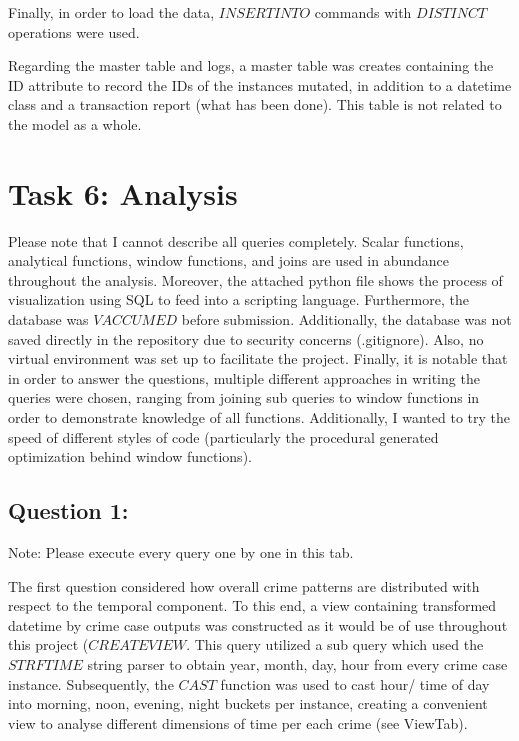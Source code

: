 \documentclass[a4paper]{article}
\begin{document}
Finally, in order to load the data, $INSERT INTO$ commands with $DISTINCT$ operations were used. 

Regarding the master table and logs, a master table was creates containing the ID attribute to record the IDs of the instances mutated, in addition to a datetime class and a transaction report (what has been done). This table is not related to the model as a whole.






\section{Task 6: Analysis}
Please note that I cannot describe all queries completely. Scalar functions, analytical functions, window functions, and joins are used in abundance throughout the analysis. Moreover, the attached python file shows the process of visualization using SQL to feed into a scripting language. Furthermore, the database was $VACCUMED$ before submission. 
Additionally, the database was not saved directly in the repository due to security concerns (.gitignore). Also, no virtual environment was set up to facilitate the project. Finally, it is notable that in order to answer the questions, multiple different approaches in writing the queries were chosen, ranging from joining sub queries to window functions in order to demonstrate knowledge of all functions. Additionally, I wanted to try the speed of different styles of code (particularly the procedural generated optimization behind window functions).

\subsection{Question 1:}

Note: Please execute every query one by one in this tab.

The first question considered how overall crime patterns are distributed with respect to the temporal component. To this end, a view containing transformed datetime by crime case  outputs was constructed as it would be of use throughout this project ($CREATE VIEW$. This query utilized a sub query which used the $STRFTIME$ string parser to obtain year, month, day, hour from every crime case instance. Subsequently, the $CAST$ function was used to cast hour/ time of day into morning, noon, evening, night buckets per instance, creating a convenient view to analyse different dimensions of time per each crime (see ViewTab).
\end{document}
